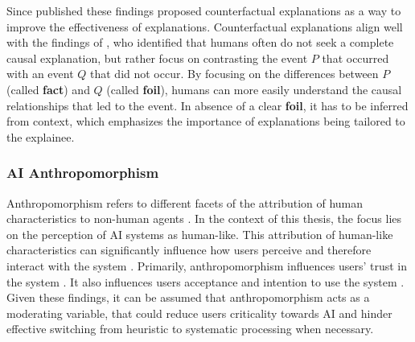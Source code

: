 Since \cite{Miller2019} published these findings \cite{Wachter2017} proposed counterfactual explanations as a way to improve the effectiveness of explanations. Counterfactual explanations align well with the findings of \cite{Lipton1990}, who identified that humans often do not seek a complete causal explanation, but rather focus on contrasting the event $P$ that occurred with an event $Q$ that did not occur. By focusing on the differences between $P$ (called \textbf{fact}) and $Q$ (called \textbf{foil}), humans can more easily understand the causal relationships that led to the event. In absence of a clear \textbf{foil}, it has to be inferred from context, which emphasizes the importance of explanations being tailored to the explainee.

\subsubsection{AI Anthropomorphism} \label{sssec:ai_anthropomorphism}

Anthropomorphism refers to different facets of the attribution of human characteristics to non-human agents \parencite{Li2022}. In the context of this thesis, the focus lies on the perception of \ac{AI} systems as human-like. This attribution of human-like characteristics can significantly influence how users perceive and therefore interact with the system \parencite{Li2022}. Primarily, anthropomorphism influences users' trust in the system \parencite{Shin2021}. It also influences users acceptance and intention to use the system \parencite{Li2022}. Given these findings, it can be assumed that anthropomorphism acts as a moderating variable, that could reduce users criticality towards \ac{AI} and hinder effective switching from heuristic to systematic processing when necessary.
